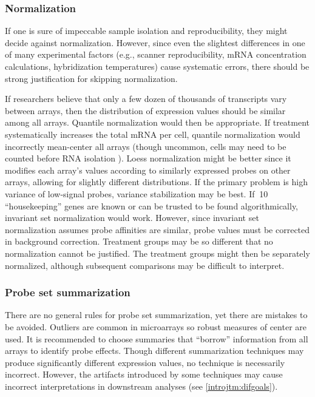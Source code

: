 \subsubsection{Normalization}

If one is sure of impeccable sample isolation and
reproducibility, they might decide against normalization. 
However, since even the slightest differences in one of many experimental factors 
(e.g., scanner reproducibility, mRNA concentration calculations, hybridization
temperatures) cause systematic errors, there should be strong 
justification for skipping normalization.

If researchers believe that only a few dozen
of thousands of transcripts vary between arrays, then the distribution
of expression values should be similar among all arrays. Quantile
normalization would then be appropriate. If treatment
systematically increases the total mRNA per cell, quantile
normalization would incorrectly mean-center all arrays 
(though uncommon, cells may need to be counted before RNA isolation \cite{Loven:2012km}).
Loess normalization might be better since it 
modifies each array's values according to similarly expressed 
probes on other arrays, allowing for slightly different distributions.
If the primary problem is high variance of low-signal probes, variance
stabilization may be best. If $~$10 ``housekeeping'' genes are known
or can be trusted to be found algorithmically, invariant set normalization
would work. However, since invariant set normalization assumes probe affinities
are similar, probe values must be corrected in background correction.
Treatment groups may be so different that
no normalization cannot be justified. The treatment groups might then
be separately normalized, although subsequent comparisons may be difficult to interpret.

\subsubsection{Probe set summarization}

There are no general rules for probe set summarization, yet
there are mistakes to be avoided. Outliers are common in microarrays
so robust measures of center are used.
It is recommended to choose summaries
that ``borrow'' information from all arrays to identify probe effects.
Though different summarization techniques may produce significantly
different expression values, no technique is necessarily incorrect.
However, the artifacts introduced by some techniques may
cause incorrect interpretations in downstream analyses (see \ref{introjtm:difgoals}).

